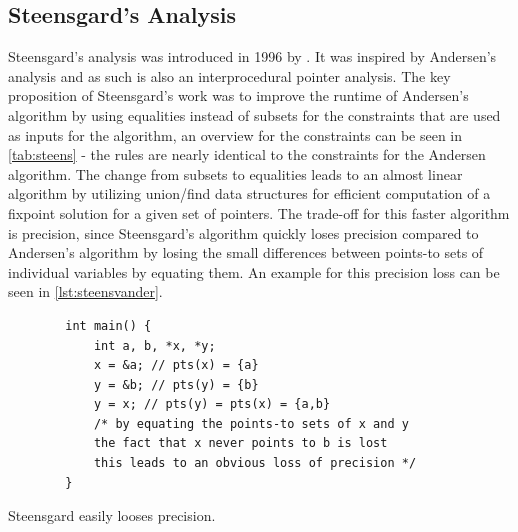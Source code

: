 \subsection{Steensgard's Analysis}
Steensgard's analysis was introduced in 1996 by \cite{steensgaard1996points}. It was inspired by Andersen's analysis and as such is also an interprocedural pointer analysis.
The key proposition of Steensgard's work was to improve the runtime of Andersen's algorithm by using equalities instead of subsets for the constraints that are used as inputs for the algorithm, an overview for the constraints can be seen in \autoref{tab:steens} - the rules are nearly identical to the constraints for the Andersen algorithm.
The change from subsets to equalities leads to an almost linear algorithm by utilizing union/find data structures for efficient computation of a fixpoint solution for a given set of pointers.
The trade-off for this faster algorithm is precision, since Steensgard's algorithm quickly loses precision compared to Andersen's algorithm by losing the small differences between points-to sets of individual variables by equating them. An example for this precision loss can be seen in \autoref{lst:steensvander}.

\begin{listing}
    \begin{verbatim}
        int main() {
            int a, b, *x, *y;
            x = &a; // pts(x) = {a}
            y = &b; // pts(y) = {b}
            y = x; // pts(y) = pts(x) = {a,b}
            /* by equating the points-to sets of x and y
            the fact that x never points to b is lost
            this leads to an obvious loss of precision */
        }
    \end{verbatim}
    \caption{Steensgard easily looses precision.}
    \label{lst:steensvander}
\end{listing}

